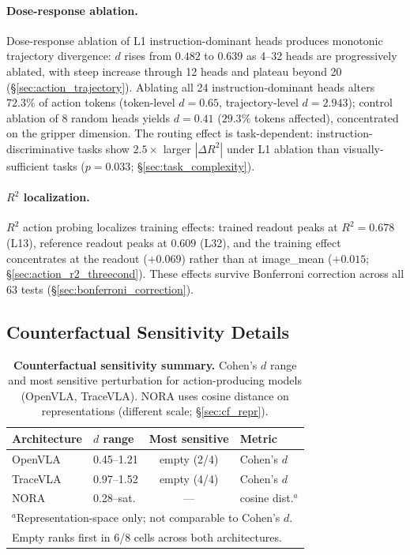 \paragraph{Dose-response ablation.}
Dose-response ablation of L1 instruction-dominant heads produces monotonic trajectory divergence: $d$ rises from $0.482$ to $0.639$ as 4--32 heads are progressively ablated, with steep increase through 12 heads and plateau beyond 20 (\S\ref{sec:action_trajectory}).
Ablating all 24 instruction-dominant heads alters $72.3\%$ of action tokens (token-level $d = 0.65$, trajectory-level $d = 2.943$); control ablation of 8 random heads yields $d = 0.41$ ($29.3\%$ tokens affected), concentrated on the gripper dimension.
The routing effect is task-dependent: instruction-discriminative tasks show $2.5\times$ larger $|\Delta R^2|$ under L1 ablation than visually-sufficient tasks ($p = 0.033$; \S\ref{sec:task_complexity}).

\paragraph{$R^2$ localization.}
$R^2$ action probing localizes training effects: trained readout peaks at $R^2 = 0.678$ (L13), reference readout peaks at $0.609$ (L32), and the training effect concentrates at the readout ($+0.069$) rather than at image\_mean ($+0.015$; \S\ref{sec:action_r2_threecond}).
These effects survive Bonferroni correction across all 63 tests (\S\ref{sec:bonferroni_correction}).

\subsection{Counterfactual Sensitivity Details}
\label{sec:cf_details_appendix}

\begin{table}[h]
\caption{\textbf{Counterfactual sensitivity summary.} Cohen's $d$ range and most sensitive perturbation for action-producing models (OpenVLA, TraceVLA). NORA uses cosine distance on representations (different scale; \S\ref{sec:cf_repr}).}
\label{tab:cf_summary}
\small
\centering
\setlength{\tabcolsep}{5pt}
\begin{tabular}{@{}llcl@{}}
\toprule
\textbf{Architecture} & \textbf{$d$ range} & \textbf{Most sensitive} & \textbf{Metric} \\
\midrule
OpenVLA & 0.45--1.21 & empty (2/4) & Cohen's $d$ \\
TraceVLA & 0.97--1.52 & empty (4/4) & Cohen's $d$ \\
\midrule
NORA    & 0.28--sat. & --- & cosine dist.$^{a}$ \\
\bottomrule
\multicolumn{4}{l}{\footnotesize $^{a}$Representation-space only; not comparable to Cohen's $d$.}\\
\multicolumn{4}{l}{\footnotesize Empty ranks first in 6/8 cells across both architectures.}\\
\end{tabular}
\end{table}

